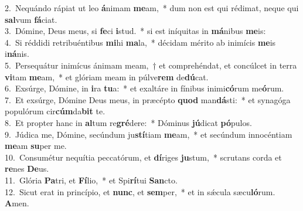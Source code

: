 {2.~}Nequándo rápiat ut leo \textbf{á}nimam \textbf{me}am,~* dum non est qui rédimat, neque qui \textbf{sal}vum \textbf{fá}ciat.\\
{3.~}Dómine, Deus meus, si \textbf{fe}ci \textbf{i}stud.~* si est iníquitas in \textbf{má}nibus \textbf{me}is:\\
{4.~}Si réddidi retribuéntibus \textbf{mi}hi \textbf{ma}la,~* décidam mérito ab inimícis \textbf{me}is i\textbf{ná}nis.\\
{5.~}Persequátur inimícus ánimam meam,~† et comprehéndat, et concúlcet in terra \textbf{vi}tam \textbf{me}am,~* et glóriam meam in púlve\textbf{rem} de\textbf{dú}cat.\\
{6.~}Exsúrge, Dómine, in \textbf{i}ra \textbf{tu}a:~* et exaltáre in fínibus inimi\textbf{có}rum me\textbf{ó}rum.\\
{7.~}Et exsúrge, Dómine Deus meus, in præcépto \textbf{quod} man\textbf{dá}sti:~* et synagóga populórum cir\textbf{cúm}da\textbf{bit} te.\\
{8.~}Et propter hanc in \textbf{al}tum re\textbf{gré}dere:~* Dóminus \textbf{jú}dicat \textbf{pó}pulos.\\
{9.~}Júdica me, Dómine, secúndum ju\textbf{stí}tiam \textbf{me}am,~* et secúndum innocéntiam \textbf{me}am \textbf{su}per me.\\
{10.~}Consumétur nequítia peccatórum, et \textbf{dí}riges \textbf{ju}stum,~* scrutans corda et \textbf{re}nes \textbf{De}us.\\
{11.~}Glória \textbf{Pa}tri, et \textbf{Fí}lio,~* et Spi\textbf{rí}tui \textbf{San}cto.\\
{12.~}Sicut erat in princípio, et \textbf{nunc}, et \textbf{sem}per,~* et in sǽcula sæcu\textbf{ló}rum. \textbf{A}men.\\
